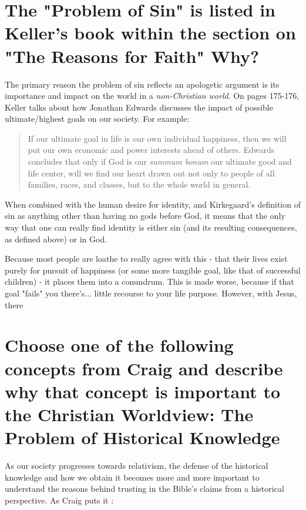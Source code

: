 \documentclass[12pt]{turabian-researchpaper}
\begin{document}
\section{The "Problem of Sin" is listed in Keller's book within the section on "The Reasons for Faith" Why? }


The primary reason the problem of sin reflects an apologetic argument is its importance and impact on the world in a \textit{non-Christian world}. On pages 175-176\autocite{keller2008reason}, Keller talks about how Jonathan Edwards discusses the impact of possible ultimate/highest goals on our society. For example:

\begin{quote}
If our ultimate goal in life is our own individual happiness, then we will put our own economic and power interests ahead of others. Edwards concludes that only if God is our \textit{summum bonum} our ultimate good and life center, will we find our heart drawn out not only to people of all families, races, and classes, but to the whole world in general.
\end{quote}

When combined with the human desire for identity, and Kirkegaard's definition of sin as anything other than having no gods before God,  it means that the only way that one can really find identity is either sin (and its resulting consequences, as defined above) or in God.

Because most people are loathe to really agree with this  - that their lives exist purely for pursuit of happiness (or some more tangible goal, like that of successful children) - it places them into a conundrum. This is made worse, because if that goal "fails" you there's... little recourse to your life purpose.  However, with Jesus, there

\section{Choose one of the following concepts from Craig and describe why that concept is important to the Christian Worldview: The Problem of Historical Knowledge}


As our society progresses towards relativism, the defense of the historical knowledge and how we obtain it becomes more and more important to understand the reasons behind trusting in the Bible's claims from a historical perspective. As Craig puts it \autocite[pg.240]{craig2008reasonable}:
\end{document}
